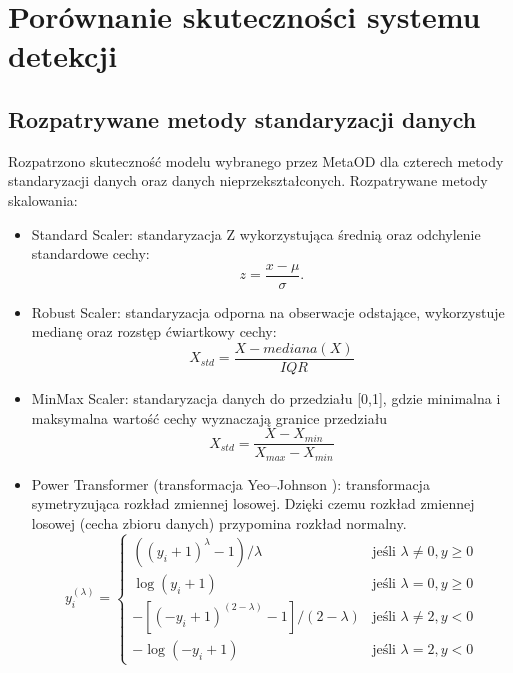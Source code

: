 \section{Porównanie skuteczności systemu detekcji}
\subsection{Rozpatrywane metody standaryzacji danych}
\label{minimen}
Rozpatrzono skuteczność modelu wybranego przez MetaOD dla czterech metody standaryzacji danych oraz danych nieprzekształconych.
Rozpatrywane metody skalowania:
\begin{itemize}
    \item Standard Scaler: standaryzacja Z wykorzystująca średnią oraz odchylenie standardowe cechy:\begin{equation}
        z=\frac{x-\mu}{\sigma}. 
    \end{equation}
    \item Robust Scaler: standaryzacja odporna na obserwacje odstające, wykorzystuje medianę oraz rozstęp ćwiartkowy cechy:
    \begin{equation}
            X_{std}=\frac{X-mediana(X)}{IQR}
    \end{equation}
    
    \item MinMax Scaler: standaryzacja danych do przedziału [0,1], gdzie minimalna i maksymalna wartość cechy wyznaczają granice przedziału  \begin{equation}
    \label{mms}
        X_{std} = \frac{X - X_{min}}{X_{max} - X_{min}}
    \end{equation}    
    \item Power Transformer (transformacja Yeo–Johnson \cite{yeo2000new}): transformacja symetryzująca rozkład zmiennej losowej. Dzięki czemu rozkład zmiennej losowej (cecha zbioru danych) przypomina rozkład normalny.
    \begin{equation}
    y_i^{(\lambda)} = \begin{cases} ((y_i+1)^\lambda-1)/\lambda                      &  \text{jeśli }\lambda \neq 0, y \geq 0 \\ 
                                \log(y_i + 1)                                    &  \text{jeśli }\lambda =    0, y \geq 0 \\ 
                                -[(-y_i + 1)^{(2-\lambda)} - 1] / (2 - \lambda)  &  \text{jeśli }\lambda \neq 2, y <    0 \\ 
                                -\log(-y_i + 1)                                  &  \text{jeśli }\lambda =    2, y <    0 
                  \end{cases}
    \end{equation}
\end{itemize}



